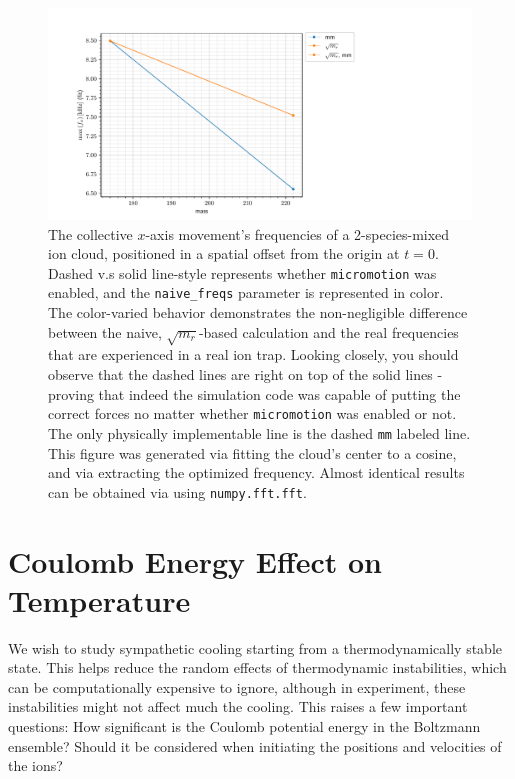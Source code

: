 \begin{figure}
	\begin{center}
		\includegraphics[width=1.2\textwidth]{graphics/micromotion_and_sqrt_freqs_effect.pdf}
	\end{center}
	\caption{The collective $x$-axis movement's frequencies of a 2-species-mixed ion cloud, positioned in a spatial offset from the origin at $t=0$. Dashed v.s solid line-style represents whether \texttt{micromotion} was enabled, and the \texttt{naive\_freqs} parameter is represented in color. The color-varied behavior demonstrates the non-negligible difference between the naive, $\sqrt{m_r}$-based calculation and the real frequencies that are experienced in a real ion trap. Looking closely, you should observe that the dashed lines are right on top of the solid lines - proving that indeed the simulation code was capable of putting the correct forces no matter whether \texttt{micromotion} was enabled or not. The only physically implementable line is the dashed \texttt{mm} labeled line. This figure was generated via fitting\cite{scipy} the cloud's center to a cosine, and via extracting the optimized frequency. Almost identical results can be obtained via using \texttt{numpy.fft.fft}\cite{numpy}.}
	\label{fig:LAMMPS_summarized_naive_freqs-micromotion}
\end{figure}

\section{Coulomb Energy Effect on Temperature}\label{sec:comp/coulomb}

We wish to study sympathetic cooling starting from a thermodynamically stable state. This helps reduce the random effects of thermodynamic instabilities, which can be computationally expensive to ignore, although in experiment, these instabilities might not affect much the cooling. This raises a few important questions: How significant is the Coulomb potential energy in the Boltzmann ensemble? Should it be considered when initiating the positions and velocities of the ions?

